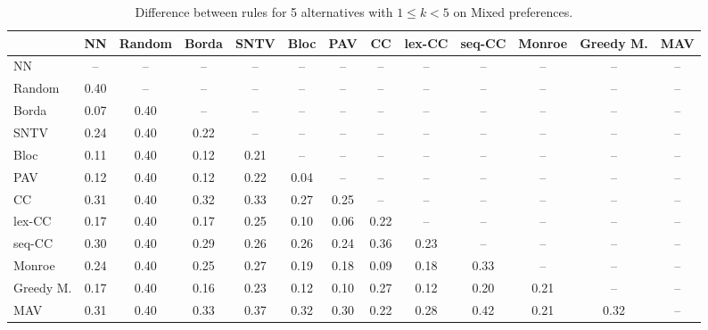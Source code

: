 
\begin{table*}[h!]
\centering
\begin{tabular}{lcccccccccccc}
\toprule
 & NN & Random & Borda & SNTV & Bloc & PAV & CC & lex-CC & seq-CC & Monroe & Greedy M. & MAV \\
\midrule
NN & -- & -- & -- & -- & -- & -- & -- & -- & -- & -- & -- & -- \\
Random & 0.40 & -- & -- & -- & -- & -- & -- & -- & -- & -- & -- & -- \\
Borda & 0.07 & 0.40 & -- & -- & -- & -- & -- & -- & -- & -- & -- & -- \\
SNTV & 0.24 & 0.40 & 0.22 & -- & -- & -- & -- & -- & -- & -- & -- & -- \\
Bloc & 0.11 & 0.40 & 0.12 & 0.21 & -- & -- & -- & -- & -- & -- & -- & -- \\
PAV & 0.12 & 0.40 & 0.12 & 0.22 & 0.04 & -- & -- & -- & -- & -- & -- & -- \\
CC & 0.31 & 0.40 & 0.32 & 0.33 & 0.27 & 0.25 & -- & -- & -- & -- & -- & -- \\
lex-CC & 0.17 & 0.40 & 0.17 & 0.25 & 0.10 & 0.06 & 0.22 & -- & -- & -- & -- & -- \\
seq-CC & 0.30 & 0.40 & 0.29 & 0.26 & 0.26 & 0.24 & 0.36 & 0.23 & -- & -- & -- & -- \\
Monroe & 0.24 & 0.40 & 0.25 & 0.27 & 0.19 & 0.18 & 0.09 & 0.18 & 0.33 & -- & -- & -- \\
Greedy M. & 0.17 & 0.40 & 0.16 & 0.23 & 0.12 & 0.10 & 0.27 & 0.12 & 0.20 & 0.21 & -- & -- \\
MAV & 0.31 & 0.40 & 0.33 & 0.37 & 0.32 & 0.30 & 0.22 & 0.28 & 0.42 & 0.21 & 0.32 & -- \\
\bottomrule
\end{tabular}

\caption{Difference between rules for 5 alternatives with $1 \leq k < 5$ on Mixed preferences.}
\end{table*}
